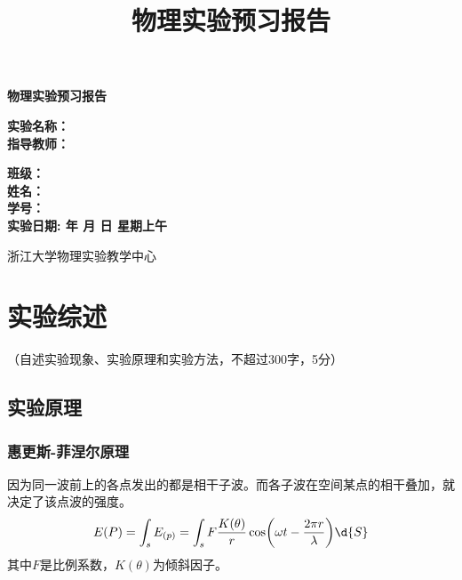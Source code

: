 \documentclass[10pt,a4paper]{ctexart}
\title{\xiaochu\textbf{物理实验预习报告}}
\author{}
\date{}
\newcommand{\myspace}[1]{\par\vspace{#1\baselineskip}} %
\newcommand{\xiaochu}{\fontsize{36pt}{42pt}\selectfont}
\newcommand{\sanhao}{\fontsize{16pt}{20pt}\selectfont}
\newcommand{\sihao}{\fontsize{14pt}{18pt}\selectfont}
\newcommand{\xiaosi}{\fontsize{12pt}{16pt}\selectfont}
\begin{document}
\vspace*{36pt} %

\begin{center}   
    \xiaochu\textbf{物理实验预习报告}
    \vspace{13pt}
    \vspace{13pt}
    \vspace{13pt}
    \vspace{13pt}
    
    \sanhao\textbf{实验名称：\underline{}} \\[10pt]
    \sanhao\textbf{指导教师：\underline{}} \\[30pt]
    
    \myspace{6}
    
   \sihao\textbf{班级：\underline{\makebox[6cm]{}}} \\[10pt]
    \sihao\textbf{姓名：\underline{\makebox[6cm]{}}} \\[10pt]
    \sihao\textbf{学号：\underline{\makebox[6cm]{}}} \\[30pt]
    
   \sihao\textbf{实验日期: 
   \underline{}  年 
   \underline{}月
   \underline{}日  
   星期\underline{}上午}
    
    \vspace{18pt}
    \sihao 浙江大学物理实验教学中心
    
\end{center}

\newpage

    \section{实验综述}
    
    \xiaosi （自述实验现象、实验原理和实验方法，不超过300字，5分）

    \subsection{实验原理}
\subsubsection{惠更斯-菲涅尔原理}
因为同一波前上的各点发出的都是相干子波。而各子波在空间某点的相干叠加，就决定了该点波的强度。
\[
E(P) = \int_s {E_{(p)}} = \int_s F\frac{K(\theta)}{r}\cos(\omega t - \frac{2 \pi r}{\lambda})\d{S}
\]
其中$F$是比例系数，$K(\theta)$为倾斜因子。
\end{document}
